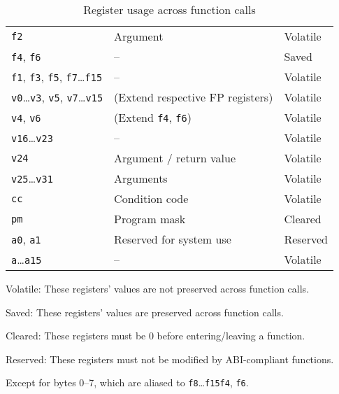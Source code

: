 \documentclass[english,11pt,twoside,toc=bib,toc=idx]{scrreprt}
\newenvironment{DIFnomarkup}{}{} %
\begin{document}
\begin{table}
\begin{DIFnomarkup}
\begin{threeparttable}
\begin{tabularx}{\textwidth}{lXl}
      \texttt{f2} & Argument & Volatile \\
      \texttt{f4}, \texttt{f6} & -- & Saved \\
      \texttt{f1}, \texttt{f3}, \texttt{f5}, \texttt{f7}…\texttt{f15} &
      -- & Volatile \\
      \texttt{v0}…\texttt{v3}, \texttt{v5}, \texttt{v7}…\texttt{v15} &
      (Extend respective FP registers) & Volatile \\
      \texttt{v4}, \texttt{v6} & (Extend \texttt{f4}, \texttt{f6}) &
      Volatile\tnote{\dagger\dagger} \\
      \fi %
      \texttt{v16}…\texttt{v23} & -- & Volatile \\
      \texttt{v24} & Argument / return value & Volatile \\
      \texttt{v25}…\texttt{v31} & Arguments & Volatile \\
      \texttt{cc} & Condition code & Volatile \\
      \texttt{pm} & Program mask & Cleared \\
      \texttt{a0}{\ifzseries , \texttt{a1}\fi} &
      Reserved for system use & Reserved \\
      \texttt{a\ifzseries 2\else 1\fi}…\texttt{a15} & -- & Volatile \\
      \bottomrule
    \end{tabularx}
    \medskip
    \begin{tablenotes}
    \item [\dagger] Volatile: These registers' values are not preserved across
      function calls.
    \item Saved: These registers' values are preserved across function
      calls.
    \item Cleared: These registers must be 0 before entering/leaving a
      function.
    \item Reserved: These registers must not be modified by
      ABI-compliant functions.
    \item [\dagger\dagger] Except for bytes 0--7, which are aliased to
      {\ifzseries \texttt{f8}…\texttt{f15}\else \texttt{f4},
        \texttt{f6}\fi}.
    \end{tablenotes}
  \end{threeparttable}
  \end{DIFnomarkup}
  \caption{Register usage across function calls}
  \label{tab:regsacrosscall}
\end{table}
\end{document}
